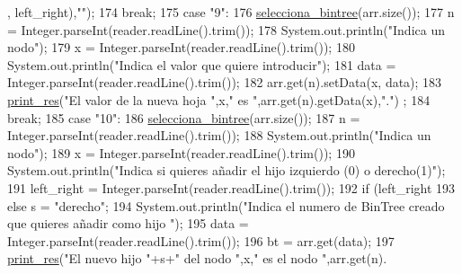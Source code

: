 \begin{DoxyCode}
      , left\_right),\textcolor{stringliteral}{""});
174                     \textcolor{keywordflow}{break};
175                     \textcolor{keywordflow}{case} \textcolor{stringliteral}{"9"}:
176                         \hyperlink{classdomini_1_1utils_1_1Driver____BinTree_a0d90bf2cb928174547e712140b5a4fe5}{selecciona\_bintree}(arr.size());
177                         n = Integer.parseInt(reader.readLine().trim());
178                         System.out.println(\textcolor{stringliteral}{"Indica un nodo"});
179                         x = Integer.parseInt(reader.readLine().trim());
180                         System.out.println(\textcolor{stringliteral}{"Indica el valor que quiere introducir"});
181                         data = Integer.parseInt(reader.readLine().trim());
182                         arr.get(n).setData(x, data);
183                         \hyperlink{classdomini_1_1utils_1_1Driver____BinTree_a434e26afb3eb701558d81b0fd1c29dcb}{print\_res}(\textcolor{stringliteral}{"El valor de la nueva hoja "},x,\textcolor{stringliteral}{" es "},arr.get(n).getData(x),\textcolor{stringliteral}{"."})
      ;
184                     \textcolor{keywordflow}{break};
185                     \textcolor{keywordflow}{case} \textcolor{stringliteral}{"10"}:
186                         \hyperlink{classdomini_1_1utils_1_1Driver____BinTree_a0d90bf2cb928174547e712140b5a4fe5}{selecciona\_bintree}(arr.size());
187                         n = Integer.parseInt(reader.readLine().trim());
188                         System.out.println(\textcolor{stringliteral}{"Indica un nodo"});
189                         x = Integer.parseInt(reader.readLine().trim());
190                         System.out.println(\textcolor{stringliteral}{"Indica si quieres añadir el hijo izquierdo (0) o derecho(1)"});
191                         left\_right = Integer.parseInt(reader.readLine().trim());
192                         \textcolor{keywordflow}{if} (left\_right%
193                         \textcolor{keywordflow}{else} s = \textcolor{stringliteral}{"derecho"};
194                         System.out.println(\textcolor{stringliteral}{"Indica el numero de BinTree creado que quieres añadir como hijo
      "});
195                         data = Integer.parseInt(reader.readLine().trim());
196                         bt = arr.get(data);
197                         \hyperlink{classdomini_1_1utils_1_1Driver____BinTree_a434e26afb3eb701558d81b0fd1c29dcb}{print\_res}(\textcolor{stringliteral}{"El nuevo hijo "}+s+\textcolor{stringliteral}{" del nodo "},x,\textcolor{stringliteral}{" es el nodo "},arr.get(n).

\end{DoxyCode}
